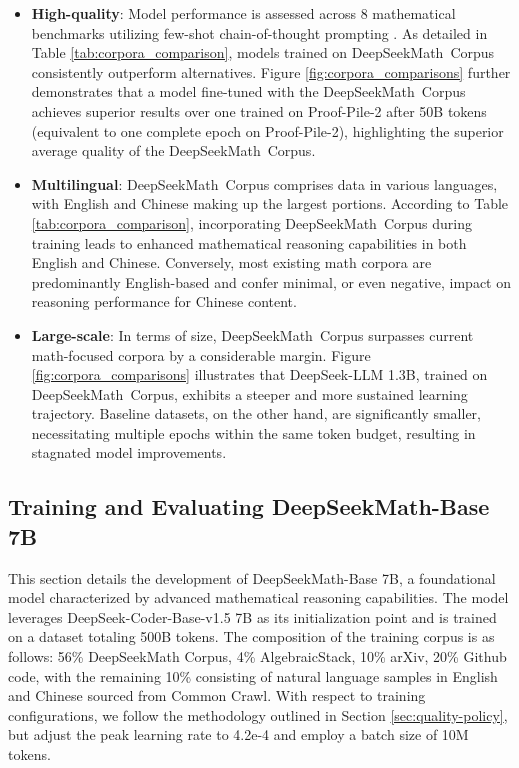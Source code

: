 \begin{itemize}[topsep=0pt]
\begin{itemize}[topsep=0pt]
    \item \textbf{High-quality}:
    Model performance is assessed across 8 mathematical benchmarks utilizing few-shot chain-of-thought prompting \cite{cot}. As detailed in Table \ref{tab:corpora_comparison}, models trained on DeepSeekMath~Corpus consistently outperform alternatives. Figure \ref{fig:corpora_comparisons} further demonstrates that a model fine-tuned with the DeepSeekMath~Corpus achieves superior results over one trained on Proof-Pile-2 after 50B tokens (equivalent to one complete epoch on Proof-Pile-2), highlighting the superior average quality of the DeepSeekMath~Corpus.
    \item \textbf{Multilingual}:
    DeepSeekMath~Corpus comprises data in various languages, with English and Chinese making up the largest portions. According to Table \ref{tab:corpora_comparison}, incorporating DeepSeekMath~Corpus during training leads to enhanced mathematical reasoning capabilities in both English and Chinese. Conversely, most existing math corpora are predominantly English-based and confer minimal, or even negative, impact on reasoning performance for Chinese content.
    \item \textbf{Large-scale}:
    In terms of size, DeepSeekMath~Corpus surpasses current math-focused corpora by a considerable margin. Figure \ref{fig:corpora_comparisons} illustrates that DeepSeek-LLM 1.3B, trained on DeepSeekMath~Corpus, exhibits a steeper and more sustained learning trajectory. Baseline datasets, on the other hand, are significantly smaller, necessitating multiple epochs within the same token budget, resulting in stagnated model improvements.
\end{itemize}

\subsection{Training and Evaluating DeepSeekMath-Base 7B}

This section details the development of DeepSeekMath-Base 7B, a foundational model characterized by advanced mathematical reasoning capabilities. The model leverages DeepSeek-Coder-Base-v1.5 7B \citep{deepseek-coder} as its initialization point and is trained on a dataset totaling 500B tokens. The composition of the training corpus is as follows: 56\% DeepSeekMath Corpus, 4\% AlgebraicStack, 10\% arXiv, 20\% Github code, with the remaining 10\% consisting of natural language samples in English and Chinese sourced from Common Crawl. With respect to training configurations, we follow the methodology outlined in Section \ref{sec:quality-policy}, but adjust the peak learning rate to 4.2e-4 and employ a batch size of 10M tokens.


\end{itemize}
